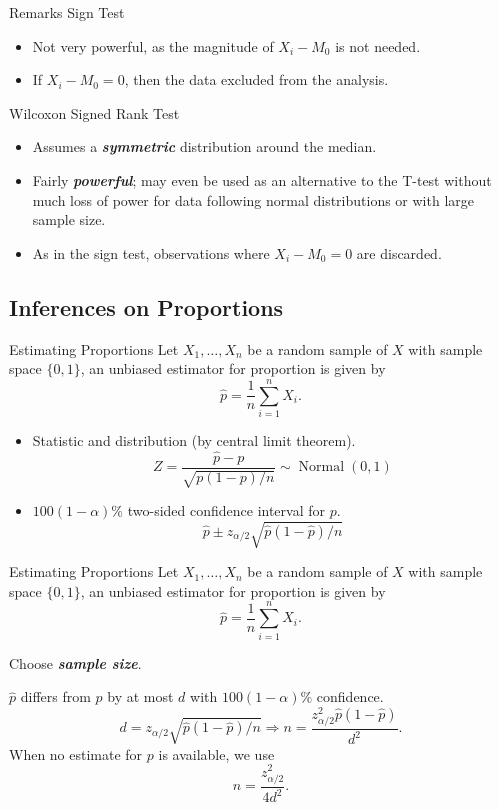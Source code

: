 \documentclass{beamer}
\newcommand{\bb}[1]{\textcolor{antiquefuchsia}{\textbf{\textit{#1}}}}
\begin{document}
\begin{frame}{Remarks}
Sign Test
\begin{itemize}
\item Not very powerful, as the magnitude of $X_{i}-M_{0}$ is not needed.
\item If $X_{i}-M_{0}=0$, then the data excluded from the analysis.
\end{itemize}

Wilcoxon Signed Rank Test
\begin{itemize}
\item Assumes a \bb{symmetric} distribution around the median.
\item Fairly \bb{powerful}; may even be used as an alternative to the T-test without much loss of power for data following normal distributions or with large sample size.
\item As in the sign test, observations where $X_{i}-M_{0}=0$ are discarded.
\end{itemize}

\end{frame}

\subsection{Inferences on Proportions}
\begin{frame}{Estimating Proportions}
Let $X_{1}, \ldots, X_{n}$ be a random sample of $X$ with sample space $\{0,1\}$, an unbiased estimator for proportion is given by
$$
\widehat{p}=\frac{1}{n} \sum_{i=1}^{n} X_{i} .
$$
\begin{itemize}
\item Statistic and distribution (by central limit theorem).
$$
Z=\frac{\widehat{p}-p}{\sqrt{p(1-p) / n}} \sim \operatorname{Normal}(0,1)
$$
\item $100(1-\alpha) \%$ two-sided confidence interval for $p$.
$$
\widehat{p} \pm z_{\alpha / 2} \sqrt{\widehat{p}(1-\widehat{p}) / n}
$$
\end{itemize}
\end{frame}

\begin{frame}{Estimating Proportions}
Let $X_{1}, \ldots, X_{n}$ be a random sample of $X$ with sample space $\{0,1\}$, an unbiased estimator for proportion is given by
$$
\widehat{p}=\frac{1}{n} \sum_{i=1}^{n} X_{i} .
$$

Choose \bb{sample size}.

 $\widehat{p}$ differs from $p$ by at most $d$ with $100(1-\alpha) \%$ confidence.
$$
d=z_{\alpha / 2} \sqrt{\widehat{p}(1-\widehat{p}) / n} \Rightarrow n=\frac{z_{\alpha / 2}^{2} \widehat{p}(1-\widehat{p})}{d^{2}} .
$$
When no estimate for $p$ is available, we use
$$
n=\frac{z_{\alpha / 2}^{2}}{4 d^{2}} .
$$
\end{frame}
\end{document}

